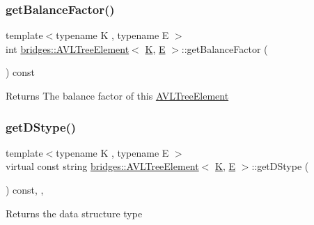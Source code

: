 \subsubsection{\texorpdfstring{getBalanceFactor()}{getBalanceFactor()}}
{\footnotesize\ttfamily template$<$typename K , typename E $>$ \\
int \mbox{\hyperlink{classbridges_1_1_a_v_l_tree_element}{bridges\+::\+A\+V\+L\+Tree\+Element}}$<$ \mbox{\hyperlink{namespacebridges_acfb0a4f7877d8f63de3e6862004c50edaa5f3c6a11b03839d46af9fb43c97c188}{K}}, \mbox{\hyperlink{namespacebridges_acfb0a4f7877d8f63de3e6862004c50eda3a3ea00cfc35332cedf6e5e9a32e94da}{E}} $>$\+::get\+Balance\+Factor (\begin{DoxyParamCaption}{ }\end{DoxyParamCaption}) const\hspace{0.3cm}{\ttfamily [inline]}}

\begin{DoxyReturn}{Returns}
The balance factor of this \mbox{\hyperlink{classbridges_1_1_a_v_l_tree_element}{A\+V\+L\+Tree\+Element}} 
\end{DoxyReturn}
\mbox{\label{classbridges_1_1_a_v_l_tree_element_a24c005f8e07a7a2682225cead3b7e364}} 
\subsubsection{\texorpdfstring{getDStype()}{getDStype()}}
{\footnotesize\ttfamily template$<$typename K , typename E $>$ \\
virtual const string \mbox{\hyperlink{classbridges_1_1_a_v_l_tree_element}{bridges\+::\+A\+V\+L\+Tree\+Element}}$<$ \mbox{\hyperlink{namespacebridges_acfb0a4f7877d8f63de3e6862004c50edaa5f3c6a11b03839d46af9fb43c97c188}{K}}, \mbox{\hyperlink{namespacebridges_acfb0a4f7877d8f63de3e6862004c50eda3a3ea00cfc35332cedf6e5e9a32e94da}{E}} $>$\+::get\+D\+Stype (\begin{DoxyParamCaption}{ }\end{DoxyParamCaption}) const\hspace{0.3cm}{\ttfamily [inline]}, {\ttfamily [override]}, {\ttfamily [virtual]}}

\begin{DoxyReturn}{Returns}
the data structure type 
\end{DoxyReturn}


